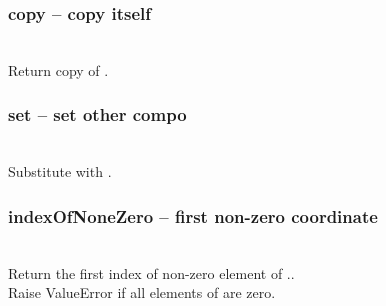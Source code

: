   \subsubsection{copy -- copy itself}
   \\
   \spacing
   \quad Return copy of .\\
   \spacing
  \subsubsection{set -- set other compo}
   \\
   \spacing
   \quad Substitute  with .\\
   \spacing
  \subsubsection{indexOfNoneZero -- first non-zero coordinate}
   \\
   \spacing
   \quad Return the first index of non-zero element of ..\\
   \spacing
   \quad \negok Raise ValueError if all elements of  are zero.\\
   \spacing

